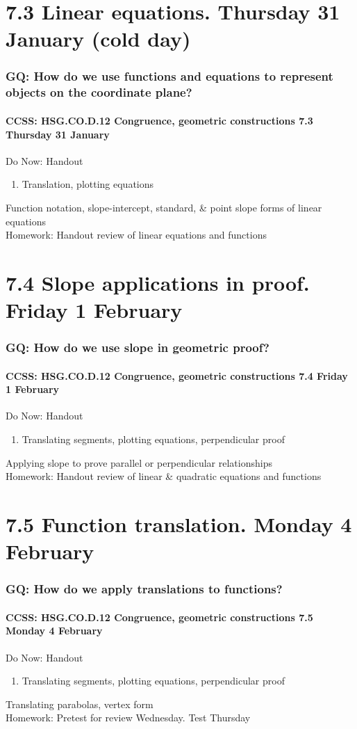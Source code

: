 \documentclass{beamer}
\begin{document}
\section{7.3 Linear equations. Thursday 31 January (cold day)}
  \frame
  {
    \frametitle{GQ: How do we use functions and equations to represent objects on the coordinate plane?}
    \framesubtitle{CCSS: HSG.CO.D.12 Congruence, geometric constructions  \alert{7.3 Thursday 31 January}}

    \begin{block}{Do Now: Handout}
      \begin{enumerate}
        \item Translation, plotting equations
      \end{enumerate}
    \end{block}
    Function notation, slope-intercept, standard, \& point slope forms of linear equations\\[0.5cm]
    Homework: Handout review of linear equations and functions
  }

\section{7.4 Slope applications in proof. Friday 1 February}
\frame
{
\frametitle{GQ: How do we use slope in geometric proof?}
\framesubtitle{CCSS: HSG.CO.D.12 Congruence, geometric constructions  \alert{7.4 Friday 1 February}}

\begin{block}{Do Now: Handout}
  \begin{enumerate}
    \item Translating segments, plotting equations, perpendicular proof
  \end{enumerate}
\end{block}
Applying slope to prove parallel or perpendicular relationships\\[0.5cm]
Homework: Handout review of linear \& quadratic equations and functions
}

\section{7.5 Function translation. Monday 4 February}
\frame
{
  \frametitle{GQ: How do we apply translations to functions?}
  \framesubtitle{CCSS: HSG.CO.D.12 Congruence, geometric constructions \hfill \alert{7.5 Monday 4 February}}

  \begin{block}{Do Now: Handout}
    \begin{enumerate}
      \item Translating segments, plotting equations, perpendicular proof
    \end{enumerate}
  \end{block}
  Translating parabolas, vertex form\\[0.5cm]
  Homework: Pretest for review Wednesday. \alert{Test Thursday}
}
\end{document}
